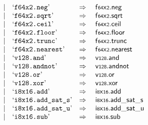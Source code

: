 $$\begin{array}[t]{@{}lrrl@{}l@{}l@{}l@{}}
& & | & \mbox{‘\texttt{f64x2.neg}’} & \quad\Rightarrow\quad{} & {\mathsf{f{\scriptstyle 64}}}{\mathsf{x}}{\mathsf{{\scriptstyle 2}}} {.} \mathsf{neg} \\
& & | & \mbox{‘\texttt{f64x2.sqrt}’} & \quad\Rightarrow\quad{} & {\mathsf{f{\scriptstyle 64}}}{\mathsf{x}}{\mathsf{{\scriptstyle 2}}} {.} \mathsf{sqrt} \\
& & | & \mbox{‘\texttt{f64x2.ceil}’} & \quad\Rightarrow\quad{} & {\mathsf{f{\scriptstyle 64}}}{\mathsf{x}}{\mathsf{{\scriptstyle 2}}} {.} \mathsf{ceil} \\
& & | & \mbox{‘\texttt{f64x2.floor}’} & \quad\Rightarrow\quad{} & {\mathsf{f{\scriptstyle 64}}}{\mathsf{x}}{\mathsf{{\scriptstyle 2}}} {.} \mathsf{floor} \\
& & | & \mbox{‘\texttt{f64x2.trunc}’} & \quad\Rightarrow\quad{} & {\mathsf{f{\scriptstyle 64}}}{\mathsf{x}}{\mathsf{{\scriptstyle 2}}} {.} \mathsf{trunc} \\
& & | & \mbox{‘\texttt{f64x2.nearest}’} & \quad\Rightarrow\quad{} & {\mathsf{f{\scriptstyle 64}}}{\mathsf{x}}{\mathsf{{\scriptstyle 2}}} {.} \mathsf{nearest} \\
& & | & \mbox{‘\texttt{v128.and}’} & \quad\Rightarrow\quad{} & \mathsf{v{\scriptstyle 128}} {.} \mathsf{and} \\
& & | & \mbox{‘\texttt{v128.andnot}’} & \quad\Rightarrow\quad{} & \mathsf{v{\scriptstyle 128}} {.} \mathsf{andnot} \\
& & | & \mbox{‘\texttt{v128.or}’} & \quad\Rightarrow\quad{} & \mathsf{v{\scriptstyle 128}} {.} \mathsf{or} \\
& & | & \mbox{‘\texttt{v128.xor}’} & \quad\Rightarrow\quad{} & \mathsf{v{\scriptstyle 128}} {.} \mathsf{xor} \\
& & | & \mbox{‘\texttt{i8x16.add}’} & \quad\Rightarrow\quad{} & {\mathsf{i{\scriptstyle 8}}}{\mathsf{x}}{\mathsf{{\scriptstyle 16}}} {.} \mathsf{add} \\
& & | & \mbox{‘\texttt{i8x16.add\_sat\_s}’} & \quad\Rightarrow\quad{} & {\mathsf{i{\scriptstyle 8}}}{\mathsf{x}}{\mathsf{{\scriptstyle 16}}} {.} {\mathsf{add\_sat}}{\mathsf{\_}}{\mathsf{s}} \\
& & | & \mbox{‘\texttt{i8x16.add\_sat\_u}’} & \quad\Rightarrow\quad{} & {\mathsf{i{\scriptstyle 8}}}{\mathsf{x}}{\mathsf{{\scriptstyle 16}}} {.} {\mathsf{add\_sat}}{\mathsf{\_}}{\mathsf{u}} \\
& & | & \mbox{‘\texttt{i8x16.sub}’} & \quad\Rightarrow\quad{} & {\mathsf{i{\scriptstyle 8}}}{\mathsf{x}}{\mathsf{{\scriptstyle 16}}} {.} \mathsf{sub} \\

\end{array}$$
